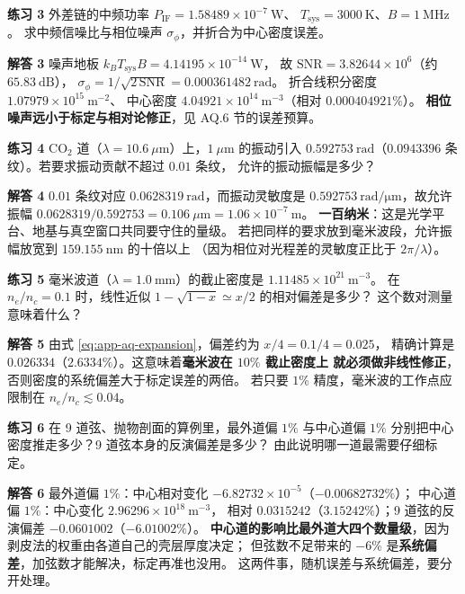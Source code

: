 \textbf{练习 3}
外差链的中频功率 $P_{\mathrm{IF}} = 1.58489\times10^{-7}\ \mathrm{W}$、
$T_{\mathrm{sys}} = 3000\ \mathrm{K}$、$B = 1\ \mathrm{MHz}$。
求中频信噪比与相位噪声 $\sigma_\phi$，并折合为中心密度误差。

\textbf{解答 3}
噪声地板 $k_BT_{\mathrm{sys}}B = 4.14195\times10^{-14}\ \mathrm{W}$，
故 $\mathrm{SNR} = 3.82644\times10^{6}$（约 $65.83\ \mathrm{dB}$），
$\sigma_\phi = 1/\sqrt{2\,\mathrm{SNR}} = 0.000361482\ \mathrm{rad}$。
折合线积分密度 $1.07979\times10^{15}\ \mathrm{m^{-2}}$、
中心密度 $4.04921\times10^{14}\ \mathrm{m^{-3}}$（相对 $0.000404921\%$）。
\textbf{相位噪声远小于标定与相对论修正}，见 AQ.6 节的误差预算。

\textbf{练习 4}
CO$_2$ 道（$\lambda = 10.6\ \mu\mathrm{m}$）上，$1\ \mu\mathrm{m}$ 的振动引入
$0.592753\ \mathrm{rad}$（$0.0943396$ 条纹）。若要求振动贡献不超过 $0.01$ 条纹，
允许的振动振幅是多少？

\textbf{解答 4}
$0.01$ 条纹对应 $0.0628319\ \mathrm{rad}$，而振动灵敏度是
$0.592753\ \mathrm{rad/\mu m}$，故允许振幅
$0.0628319/0.592753 = 0.106\ \mu\mathrm{m} = 1.06\times10^{-7}\ \mathrm{m}$。
\textbf{一百纳米}：这是光学平台、地基与真空窗口共同要守住的量级。
若把同样的要求放到毫米波段，允许振幅放宽到 $159.155\ \mathrm{nm}$ 的十倍以上
（因为相位对光程差的灵敏度正比于 $2\pi/\lambda$）。

\textbf{练习 5}
毫米波道（$\lambda = 1.0\ \mathrm{mm}$）的截止密度是 $1.11485\times10^{21}\ \mathrm{m^{-3}}$。
在 $n_e/n_c = 0.1$ 时，线性近似 $1-\sqrt{1-x}\simeq x/2$ 的相对偏差是多少？
这个数对测量意味着什么？

\textbf{解答 5}
由式 \eqref{eq:app-aq-expansion}，偏差约为 $x/4 = 0.1/4 = 0.025$，
精确计算是 $0.026334$（$2.6334\%$）。这意味着\textbf{毫米波在 $10\%$ 截止密度上
就必须做非线性修正}，否则密度的系统偏差大于标定误差的两倍。
若只要 $1\%$ 精度，毫米波的工作点应限制在 $n_e/n_c\lesssim 0.04$。

\textbf{练习 6}
在 9 道弦、抛物剖面的算例里，最外道偏 $1\%$ 与中心道偏 $1\%$
分别把中心密度推走多少？9 道弦本身的反演偏差是多少？
由此说明哪一道最需要仔细标定。

\textbf{解答 6}
最外道偏 $1\%$：中心相对变化 $-6.82732\times10^{-5}$（$-0.00682732\%$）；
中心道偏 $1\%$：中心变化 $2.96296\times10^{18}\ \mathrm{m^{-3}}$，
相对 $0.0315242$（$3.15242\%$）；9 道弦的反演偏差 $-0.0601002$（$-6.01002\%$）。
\textbf{中心道的影响比最外道大四个数量级}，因为剥皮法的权重由各道自己的壳层厚度决定；
但弦数不足带来的 $-6\%$ 是\textbf{系统偏差}，加弦数才能解决，标定再准也没用。
这两件事，随机误差与系统偏差，要分开处理。

